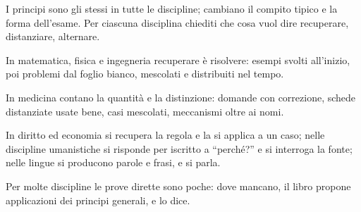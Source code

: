 \begin{sintesi}
  \item I principi sono gli stessi in tutte le discipline; cambiano il
        compito tipico e la forma dell'esame. Per ciascuna disciplina
        chiediti che cosa vuol dire recuperare, distanziare, alternare.
  \item In matematica, fisica e ingegneria recuperare è risolvere: esempi
        svolti all'inizio, poi problemi dal foglio bianco, mescolati e
        distribuiti nel tempo.
  \item In medicina contano la quantità e la distinzione: domande con
        correzione, schede distanziate usate bene, casi mescolati,
        meccanismi oltre ai nomi.
  \item In diritto ed economia si recupera la regola e la si applica a un
        caso; nelle discipline umanistiche si risponde per iscritto a
        \enquote{perché?} e si interroga la fonte; nelle lingue si
        producono parole e frasi, e si parla.
  \item Per molte discipline le prove dirette sono poche: dove mancano,
        il libro propone applicazioni dei principi generali, e lo dice.
\end{sintesi}

\finecapitolo
